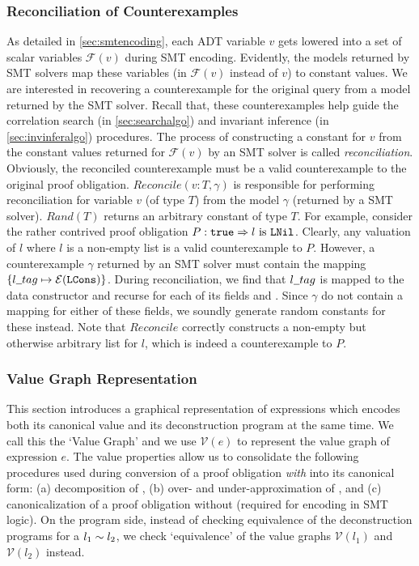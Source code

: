\subsubsection{Reconciliation of Counterexamples}
\label{sec:cerecons}
As detailed in \cref{sec:smtencoding}, each ADT variable $v$ gets lowered into a set of scalar
variables $\mathcal{F}(v)$ during SMT encoding.
Evidently, the models returned by SMT solvers map these variables (in $\mathcal{F}(v)$ instead of $v$)
to constant values.
We are interested in recovering a counterexample for the original query from a
model returned by the SMT solver.
Recall that, these counterexamples help guide the correlation search (in \cref{sec:searchalgo})
and invariant inference (in \cref{sec:invinferalgo}) procedures.
The process of constructing a constant for $v$ from the constant values returned for $\mathcal{F}(v)$
by an SMT solver is called {\em reconciliation}.
Obviously, the reconciled counterexample must be a valid counterexample to the original proof obligation.
$Reconcile(v:T, \gamma)$ is responsible for performing reconciliation for variable $v$ (of type $T$)
from the model $\gamma$ (returned by a SMT solver).
$Rand(T)$ returns an arbitrary constant of type $T$.
For example, consider the rather contrived proof obligation $P: {\tt true} \Rightarrow l\ \mathrm{is}\ {\tt {\tt LNil}}$.
Clearly, any valuation of $l$ where $l$ is a non-empty list is a valid counterexample to $P$.
However, a counterexample $\gamma$ returned by an SMT solver must contain
the mapping $\{ l \strsep{} tag \mapsto \mathcal{E}(\cons{LCons}) \}$.
During reconciliation, we find that $l \strsep{} tag$ is mapped to the data constructor 
and recurse for each of its fields  and .
Since $\gamma$ do not contain a mapping for either of these fields, we soundly generate random constants
for these instead.
Note that $Reconcile$ correctly constructs a non-empty but otherwise arbitrary list for $l$, which
is indeed a counterexample to $P$.



\subsubsection{Value Graph Representation}
\label{sec:valuegraph}
This section introduces a graphical representation of expressions which encodes both its canonical value and
its deconstruction program at the same time.
We call this the `Value Graph' and we use $\mathcal{V}(e)$ to represent the value graph of expression $e$.
The value properties allow us to consolidate the following procedures used during conversion of a proof obligation
{\em with} \recursiveRelations{} into its canonical form:
(a) decomposition of \recursiveRelations{}, (b) over- and under-approximation of \recursiveRelations{},
and (c) canonicalization of a proof obligation without \recursiveRelations{} (required for encoding in SMT logic).
On the program side, instead of checking equivalence of the deconstruction programs for a \recursiveRelation{} $l_1 \sim{} l_2$,
we check `equivalence' of the value graphs $\mathcal{V}(l_1)$ and $\mathcal{V}(l_2)$ instead.

